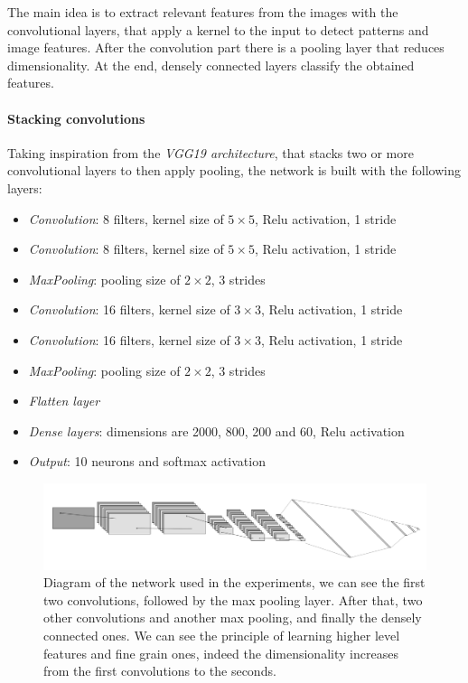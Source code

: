 The main idea is to extract relevant features from the images 
with the convolutional layers, that apply a kernel to the input 
to detect patterns and image features.
After the convolution part there is a pooling layer that reduces dimensionality.
At the end, densely connected layers classify the obtained features.

\paragraph{Stacking convolutions}
Taking inspiration from the \emph{VGG19 architecture}, that stacks two or more 
convolutional layers to then apply pooling, the network is built with 
the following layers:~\cite{vgg}
\begin{itemize}
    \item \emph{Convolution}: 8 filters, kernel size of $5 \times 5$, Relu activation, 1 stride
    \item \emph{Convolution}: 8 filters, kernel size of $5 \times 5$, Relu activation, 1 stride
    \item \emph{MaxPooling}: pooling size of $2 \times 2$, 3 strides
    \item \emph{Convolution}: 16 filters, kernel size of $3 \times 3$, Relu activation, 1 stride
    \item \emph{Convolution}: 16 filters, kernel size of $3 \times 3$, Relu activation, 1 stride
    \item \emph{MaxPooling}: pooling size of $2 \times 2$, 3 strides
    \item \emph{Flatten layer}
    \item \emph{Dense layers}: dimensions are 2000, 800, 200 and 60, Relu activation
    \item \emph{Output}: 10 neurons and softmax activation
\end{itemize}

\begin{figure}[h]
    \includegraphics[width=\textwidth]{images/cnn.png}  
    \caption{Diagram of the network used in the experiments, we can see 
    the first two convolutions, followed by the max pooling layer. After that, two other convolutions and 
    another max pooling, and finally the densely connected ones. We can see the principle of 
    learning higher level features and fine grain ones, indeed the dimensionality increases 
    from the first convolutions to the seconds.}  
    \label{cnn}
\end{figure}

